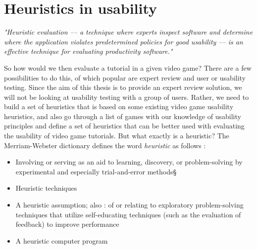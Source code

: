 \section{Heuristics in usability}

\begin{displayquote}
	\textit{"Heuristic evaluation –-- a technique where experts inspect software and determine where the application violates predetermined policies for good usability –-- is an effective technique for evaluating productivity software."} \cite{Livingston2010}
\end{displayquote}

So how would we then evaluate a tutorial in a given video game? There are a few possibilities to do this, of which popular are expert review and user or usability testing. Since the aim of this thesis is to provide an expert review solution, we will not be looking at usability testing with a group of users. Rather, we need to build a set of heuristics that is based on some existing video game usability heuristics, and also go through a list of games with our knowledge of usability principles and define a set of heuristics that can be better used with evaluating the usability of video game tutorials. But what exactly is a heuristic? The Merriam-Webster dictionary defines the word \textit{heuristic} as follows \cite{merriam2007}: 

\begin{itemize}
	\item Involving or serving as an aid to learning, discovery, or problem-solving by experimental and especially trial-and-error methods§ 
	\item Heuristic techniques 
	\item A heuristic assumption; also :  of or relating to exploratory problem-solving techniques that utilize self-educating techniques (such as the evaluation of feedback) to improve performance 
	\item A heuristic computer program 
	
\end{itemize}

